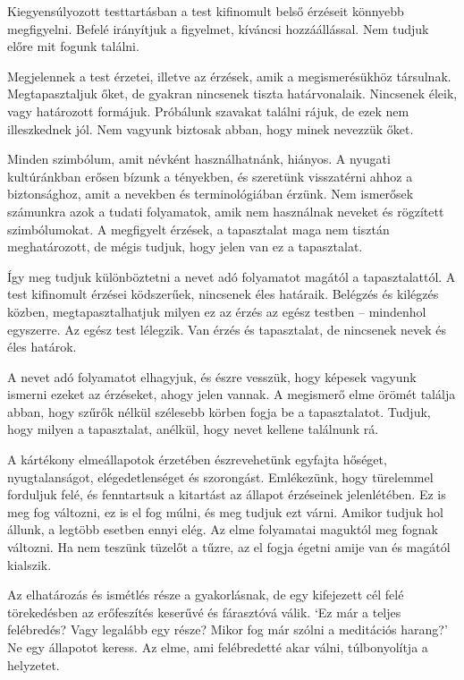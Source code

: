 Kiegyensúlyozott testtartásban a test kifinomult belső érzéseit könnyebb
megfigyelni. Befelé irányítjuk a figyelmet, kíváncsi hozzáállással. Nem
tudjuk előre mit fogunk találni.

Megjelennek a test érzetei, illetve az érzések, amik a megismerésükhöz
társulnak. Megtapasztaljuk őket, de gyakran nincsenek tiszta
határvonalaik. Nincsenek éleik, vagy határozott formájuk. Próbálunk
szavakat találni rájuk, de ezek nem illeszkednek jól. Nem vagyunk
biztosak abban, hogy minek nevezzük őket.

Minden szimbólum, amit névként használhatnánk, hiányos. A nyugati
kultúránkban erősen bízunk a tényekben, és szeretünk visszatérni ahhoz a
biztonsághoz, amit a nevekben és terminológiában érzünk. Nem ismerősek
számunkra azok a tudati folyamatok, amik nem használnak neveket és
rögzített szimbólumokat. A megfigyelt érzések, a tapasztalat maga nem
tisztán meghatározott, de mégis tudjuk, hogy jelen van ez a tapasztalat.

Így meg tudjuk különböztetni a nevet adó folyamatot magától a
tapasztalattól. A test kifinomult érzései ködszerűek, nincsenek éles
határaik. Belégzés és kilégzés közben, megtapasztalhatjuk milyen ez az
érzés az egész testben -- mindenhol egyszerre. Az egész test lélegzik.
Van érzés és tapasztalat, de nincsenek nevek és éles határok.

A nevet adó folyamatot elhagyjuk, és észre vesszük, hogy képesek vagyunk
ismerni ezeket az érzéseket, ahogy jelen vannak. A megismerő elme örömét
találja abban, hogy szűrők nélkül szélesebb körben fogja be a
tapasztalatot. Tudjuk, hogy milyen a tapasztalat, anélkül, hogy nevet
kellene találnunk rá.


A kártékony elmeállapotok érzetében észrevehetünk egyfajta hőséget,
nyugtalanságot, elégedetlenséget és szorongást. Emlékezünk, hogy
türelemmel forduljuk felé, és fenntartsuk a kitartást az állapot
érzéseinek jelenlétében. Ez is meg fog változni, ez is el fog múlni, és
meg tudjuk ezt várni. Amikor tudjuk hol állunk, a legtöbb esetben ennyi
elég. Az elme folyamatai maguktól meg fognak változni. Ha nem teszünk
tüzelőt a tűzre, az el fogja égetni amije van és magától kialszik.

Az elhatározás és ismétlés része a gyakorlásnak, de egy kifejezett cél
felé törekedésben az erőfeszítés keserűvé és fárasztóvá válik. `Ez már a
teljes felébredés? Vagy legalább egy része? Mikor fog már szólni a
meditációs harang?' Ne egy állapotot keress. Az elme, ami felébredetté
akar válni, túlbonyolítja a helyzetet.

